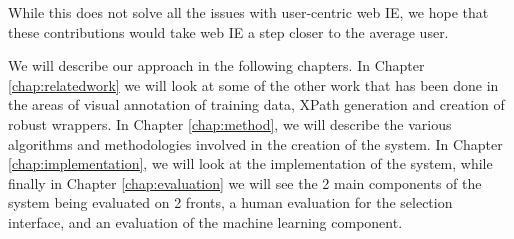 While this does not solve all the issues with user-centric web IE, we hope that these contributions
would take web IE a step closer to the average user.

We will describe our approach in the following chapters. In Chapter \ref{chap:relatedwork} we
will look at some of the other work that has been done in the areas of visual annotation of
training data, XPath generation and creation of robust wrappers. In Chapter \ref{chap:method},
we will describe the various algorithms and methodologies involved in the creation of the
system. In Chapter \ref{chap:implementation}, we will look at the implementation of the system,
while finally in Chapter \ref{chap:evaluation} we will see the 2 main components of the system
being evaluated on 2 fronts, a human evaluation for the selection interface, and an evaluation
of the machine learning component.